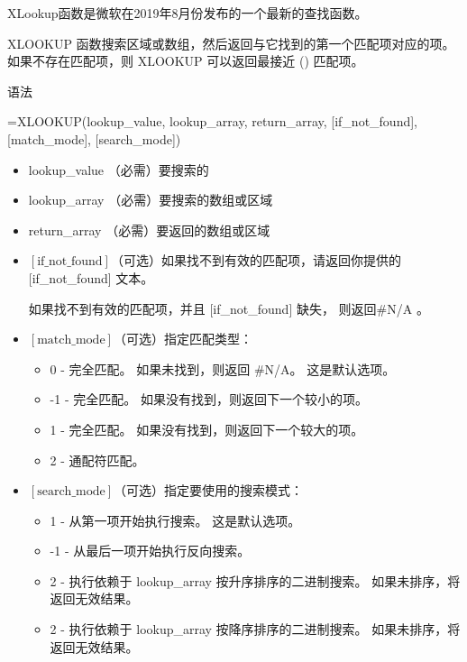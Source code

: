 XLookup函数是微软在2019年8月份发布的一个最新的查找函数。

XLOOKUP 函数搜索区域或数组，然后返回与它找到的第一个匹配项对应的项。 如果不存在匹配项，则 XLOOKUP 可以返回最接近 () 匹配项。

语法

=XLOOKUP(lookup\_value, lookup\_array, return\_array, [if\_not\_found], [match\_mode], [search\_mode]) 

\begin{itemize}
    \item lookup\_value （必需）要搜索的
    \item lookup\_array （必需）要搜索的数组或区域
    \item return\_array （必需）要返回的数组或区域
    \item $[\mathrm{if\_not\_found}]$（可选）如果找不到有效的匹配项，请返回你提供的 [if\_not\_found] 文本。
    
    如果找不到有效的匹配项，并且 [if\_not\_found] 缺失， 则返回\#N/A 。
    \item $[\mathrm{match\_mode}]$（可选）指定匹配类型：
        \begin{itemize}
            \item 0 - 完全匹配。 如果未找到，则返回 \#N/A。 这是默认选项。
            \item -1 - 完全匹配。 如果没有找到，则返回下一个较小的项。
            \item 1 - 完全匹配。 如果没有找到，则返回下一个较大的项。
            \item 2 - 通配符匹配。
        \end{itemize} 
    \item $[\mathrm{search\_mode}]$（可选）指定要使用的搜索模式：
        \begin{itemize}
            \item 1 - 从第一项开始执行搜索。 这是默认选项。
            \item -1 - 从最后一项开始执行反向搜索。
            \item 2 - 执行依赖于 lookup\_array 按升序排序的二进制搜索。 如果未排序，将返回无效结果。
            \item 2 - 执行依赖于 lookup\_array 按降序排序的二进制搜索。 如果未排序，将返回无效结果。
        \end{itemize} 
\end{itemize}
